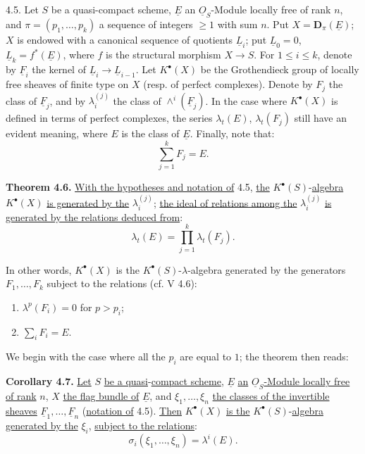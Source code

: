 4.5.
Let \(S\) be a quasi-compact scheme, \(\underline{E}\) an \(\underline{O}_S\)-Module locally free of rank \(n\), and \(\pi=(p_1,\ldots,p_k)\) a sequence of integers \(\geq1\) with sum \(n\). Put \(X=\mathbf D_\pi(\underline{E})\); \(X\) is endowed with a canonical sequence of quotients \(\underline{L}_i\); put \(\underline{L}_0=0\), \(\underline{L}_k=f^*(\underline{E})\), where \(f\) is the structural morphism \(X\to S\). For \(1\le i\le k\), denote by \(\underline{F}_i\) the kernel of \(\underline{L}_i\to \underline{L}_{i-1}\). Let \(K^{\bullet}(X)\) be the Grothendieck group of locally free sheaves of finite type on \(X\) (resp. of perfect complexes). Denote by \(F_j\) the class of \(\underline{F}_j\), and by \(\lambda_i^{(j)}\) the class of \(\wedge^i(\underline{F}_j)\). In the case where \(K^{\bullet}(X)\) is defined in terms of perfect complexes, the series \(\lambda_t(E)\), \(\lambda_t(F_j)\) still have an evident meaning, where \(E\) is the class of \(\underline{E}\). Finally, note that:
\[
  \sum_{j=1}^{k}F_j=E.
\]

\textbf{Theorem 4.6.} \uline{With the hypotheses and notation of} 4.5, \uline{the} \(K^{\bullet}(S)\)-\uline{algebra} \(K^{\bullet}(X)\) \uline{is generated by the} \(\lambda_i^{(j)}\); \uline{the ideal of relations among the} \(\lambda_i^{(j)}\) \uline{is generated by the relations deduced from}:
\[
  \lambda_t(E)=\prod_{j=1}^{k}\lambda_t(F_j).
\]

%
In other words, \(K^{\bullet}(X)\) is the \(K^{\bullet}(S)\)-\(\lambda\)-algebra generated by the generators \(F_1,\ldots,F_k\) subject to the relations (cf. V 4.6):
\begin{enumerate}[label=\textup{\roman*)}]
\item \(\lambda^p(F_i)=0\) for \(p>p_i\);
\item \(\sum_i F_i=E\).
\end{enumerate}

We begin with the case where all the \(p_i\) are equal to \(1\); the theorem then reads:

\textbf{Corollary 4.7.} \uline{Let} \(S\) \uline{be a quasi}-\uline{compact scheme}, \(\underline{E}\) \uline{an} \(\underline{O}_S\)\uline{-Module locally free of rank} \(n\), \(X\) \uline{the flag bundle of} \(\underline{E}\), and \(\xi_1,\ldots,\xi_n\) \uline{the classes of the invertible sheaves} \(\underline{F}_1,\ldots,\underline{F}_n\) (\uline{notation of} 4.5). \uline{Then} \(K^{\bullet}(X)\) \uline{is the} \(K^{\bullet}(S)\)-\uline{algebra generated by the} \(\xi_i\), \uline{subject to the relations}:
\[
  \sigma_i(\xi_1,\ldots,\xi_n)=\lambda^i(E).
\]

